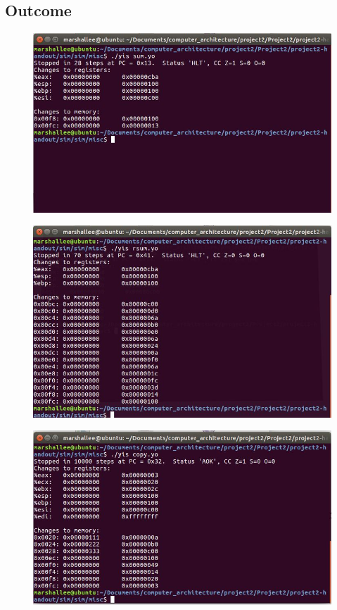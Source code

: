 \documentclass[12pt,a4paper]{article}
\theoremstyle{definition}
\numberwithin{equation}{section}
\numberwithin{figure}{section}
\begin{document}
\subsection{Outcome}
\begin{figure}[H]
	\centering
	\includegraphics[width=12cm]{sum.jpg}	
\end{figure}



\begin{figure}[H]
	\centering
	\includegraphics[width=12cm]{rsum.jpg}
\end{figure}
\begin{figure}[H]
	\centering
	\includegraphics[width=12cm]{copy.jpg}
\end{figure}
\newpage
\end{document}
